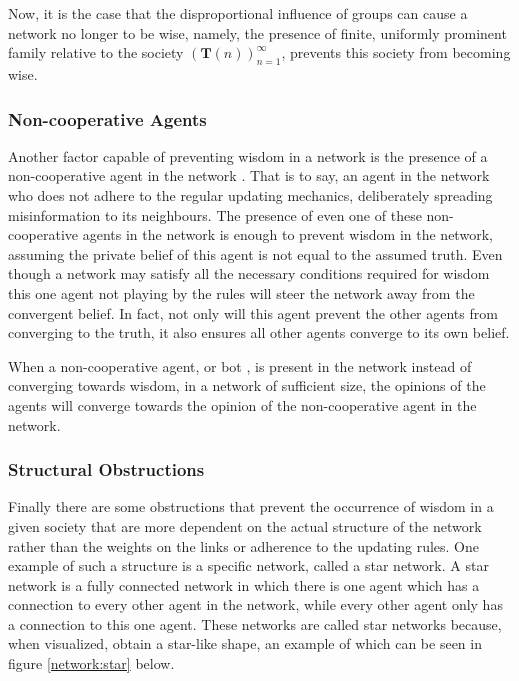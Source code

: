 \documentclass{article}
\newcommand{\T}{\textbf{T}}
\newcommand{\Soc}{(\T(n))^{\infty}_{n=1}}
\begin{document}
Now, it is the case that the disproportional influence of groups can cause a network no longer to be wise, namely, the presence of finite, uniformly prominent family relative to the society $\Soc$, prevents this society from becoming wise.

\subsubsection{Non-cooperative Agents}
\label{non-coop}
Another factor capable of preventing wisdom in a network is the presence of a non-cooperative agent in the network \cite{amir2021robust}. That is to say, an agent in the network who does not adhere to the regular updating mechanics, deliberately spreading misinformation to its neighbours. The presence of even one of these non-cooperative agents in  the network is enough to prevent wisdom in the network, assuming the private belief of this agent is not equal to the assumed truth. Even though a network may satisfy all the necessary conditions required for wisdom this one agent not playing by the rules will steer the network away from the convergent belief. In fact, not only will this agent prevent the other agents from converging to the truth, it also ensures all other agents converge to its own belief.


When a non-cooperative agent, or bot \cite{amir2021robust}, is present in the network instead of converging towards wisdom, in a network of sufficient size, the opinions of the agents will converge towards the opinion of the non-cooperative agent in the network. 

\subsubsection{Structural Obstructions}

Finally there are some obstructions that prevent the occurrence of wisdom in a given society that are more dependent on the actual structure of the network rather than the weights on the links or adherence to the updating rules. One example of such a structure is a specific network, called a star network. A star network is a fully connected network in which there is one agent which has a connection to every other agent in the network, while every other agent only has a connection to this one agent. These networks are called star networks because, when visualized, obtain a star-like shape, an example of which can be seen in figure \ref{network:star} below.
\end{document}
